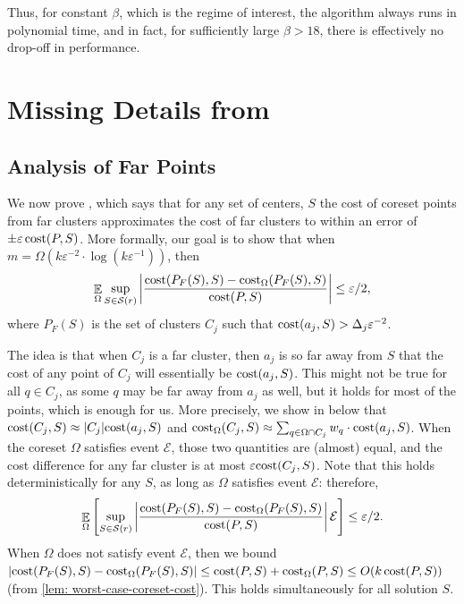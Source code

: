 \documentclass[11pt]{article}
\theoremstyle{restate}
\theoremstyle{definition}
\newcommand{\eps}{\ensuremath{\varepsilon}}
\newcommand{\E}{\mathop{\mathbb{E}}}
\newcommand{\cost}{\textnormal{cost}}
\newcommand{\costom}{\cost_\Omega} %
\newcommand{\csize}{m}
\newcommand{\inSR}{\in \mathcal{S}(r)}
\newcommand{\calE}{\mathcal E}
\begin{document}
Thus, for constant $\beta$, which is the regime of interest, the algorithm always runs in polynomial time, and in fact, for sufficiently large $\beta> 18$, there is effectively no drop-off in performance.


\section{\texorpdfstring{Missing Details from }{Missing Details from Analysis}}

\subsection{Analysis of Far Points}
\label{sec:far-points}
We now prove , which says that for any set of centers, $S$ the cost of coreset points from far clusters approximates the cost of far clusters to within an error of $\pm \eps \,\cost(P,S)$. 
More formally, our goal is to show  that when $\csize = \Omega( k \eps^{-2}  \cdot \log(k \eps^{-1}))$, then
	\begin{align*}
		\begin{split}
			\E_{ \Omega} \sup_{S\inSR} \left\lvert \frac{\cost(P_F(S),S) - \costom(P_F(S),S)}{\cost(P,S)} \right\rvert \leq \eps/2,
		\end{split}
	\end{align*}
where $P_F(S)$ is the set of clusters $C_j$ such that $\cost(a_j, S) > \Delta_j \eps^{-2}$.

The idea is that when $C_j$ is a far cluster, then  $a_j$ is so far away from $S$ that the cost of any point of $C_j$ will essentially be $\cost(a_j, S)$. This might not be true for all $q \in C_j$, as some $q$ may be far away from $a_j$ as well, but it holds for most of the points, which is enough for us. 
More precisely, we show in  below that $\cost(C_j, S) \approx |C_j| \cost(a_j, S)$ and $\costom(C_j, S) \approx \sum_{q \in \Omega \cap C_j} w_q \cdot \cost(a_j, S)$.
When the coreset $\Omega$ satisfies event $\mathcal E$, those two quantities are (almost) equal, and the cost difference for any far cluster is at most $\eps \cost(C_j, S)$. 
Note that this holds deterministically for any $S$, as long as $\Omega$ satisfies event $\mathcal E$: therefore, 
\[\E_{ \Omega} \left[\sup_{S\inSR} \left\lvert \frac{\cost(P_F(S),S) - \costom(P_F(S),S)}{\cost(P,S)} \right\rvert \mathcal{E}   \right] \leq \eps/2.\]
When $\Omega$ does not satisfy event $\calE$, then we bound $|\cost(P_F(S),S) - \costom(P_F(S),S)| \leq \cost(P,S) + \costom(P,S) \leq O(k\, \cost(P, S))$ (from \cref{lem: worst-case-coreset-cost}). This holds simultaneously for all solution $S$. 
\end{document}
